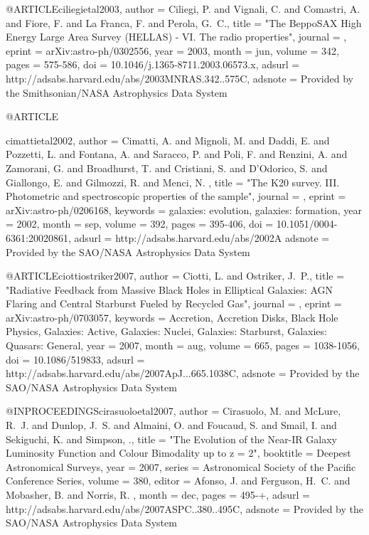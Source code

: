 {{{{{{{{{{{{{@ARTICLE{ciliegietal2003,
   author = {{Ciliegi}, P. and {Vignali}, C. and {Comastri}, A. and {Fiore}, F. and 
	{La Franca}, F. and {Perola}, G.~C.},
    title = "{The BeppoSAX High Energy Large Area Survey (HELLAS) - VI. The radio properties}",
  journal = {\mnras},
   eprint = {arXiv:astro-ph/0302556},
     year = 2003,
    month = jun,
   volume = 342,
    pages = {575-586},
      doi = {10.1046/j.1365-8711.2003.06573.x},
   adsurl = {http://adsabs.harvard.edu/abs/2003MNRAS.342..575C},
  adsnote = {Provided by the Smithsonian/NASA Astrophysics Data System}
}

@ARTICLE{cimattietal2002,
   author = {{Cimatti}, A. and {Mignoli}, M. and {Daddi}, E. and {Pozzetti}, L. and 
	{Fontana}, A. and {Saracco}, P. and {Poli}, F. and {Renzini}, A. and 
	{Zamorani}, G. and {Broadhurst}, T. and {Cristiani}, S. and 
	{D'Odorico}, S. and {Giallongo}, E. and {Gilmozzi}, R. and {Menci}, N.
	},
    title = "{The K20 survey. III. Photometric and spectroscopic properties of the sample}",
  journal = {\aap},
   eprint = {arXiv:astro-ph/0206168},
 keywords = {galaxies: evolution, galaxies: formation},
     year = 2002,
    month = sep,
   volume = 392,
    pages = {395-406},
      doi = {10.1051/0004-6361:20020861},
   adsurl = {http://adsabs.harvard.edu/abs/2002A%
  adsnote = {Provided by the SAO/NASA Astrophysics Data System}
}

@ARTICLE{ciottiostriker2007,
   author = {{Ciotti}, L. and {Ostriker}, J.~P.},
    title = "{Radiative Feedback from Massive Black Holes in Elliptical Galaxies: AGN Flaring and Central Starburst Fueled by Recycled Gas}",
  journal = {\apj},
   eprint = {arXiv:astro-ph/0703057},
 keywords = {Accretion, Accretion Disks, Black Hole Physics, Galaxies: Active, Galaxies: Nuclei, Galaxies: Starburst, Galaxies: Quasars: General},
     year = 2007,
    month = aug,
   volume = 665,
    pages = {1038-1056},
      doi = {10.1086/519833},
   adsurl = {http://adsabs.harvard.edu/abs/2007ApJ...665.1038C},
  adsnote = {Provided by the SAO/NASA Astrophysics Data System}
}



@INPROCEEDINGS{cirasuoloetal2007,
   author = {{Cirasuolo}, M. and {McLure}, R.~J. and {Dunlop}, J.~S. and 
	{Almaini}, O. and {Foucaud}, S. and {Smail}, I. and {Sekiguchi}, K. and 
	{Simpson}, .},
    title = "{The Evolution of the Near-IR Galaxy Luminosity Function and Colour Bimodality up to z = 2}",
booktitle = {Deepest Astronomical Surveys},
     year = 2007,
   series = {Astronomical Society of the Pacific Conference Series},
   volume = 380,
   editor = {{Afonso}, J. and {Ferguson}, H.~C. and {Mobasher}, B. and {Norris}, R.
	},
    month = dec,
    pages = {495-+},
   adsurl = {http://adsabs.harvard.edu/abs/2007ASPC..380..495C},
  adsnote = {Provided by the SAO/NASA Astrophysics Data System}
}

}}}}}}}}}}}}}}
